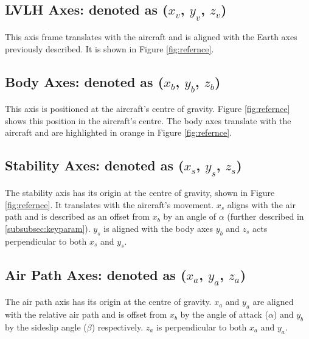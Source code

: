 \subsection{LVLH Axes: denoted as \texorpdfstring{($x_v$, $y_v$, $z_v$)}{L}}
 This axis frame translates with the aircraft and is aligned with the Earth axes previously described. It is shown in Figure \ref{fig:refernce}.

\subsection{Body Axes: denoted as \texorpdfstring{($x_b$, $y_b$, $z_b$)}{L}} 
This axis is positioned at the aircraft's centre of gravity. Figure \ref{fig:refernce} shows this position in the aircraft's centre. The body axes translate with the aircraft and are highlighted in orange in Figure \ref{fig:refernce}.

\subsection{Stability Axes: denoted as \texorpdfstring{($x_s$, $y_s$, $z_s$)}{L}} 
The stability axis has its origin at the centre of gravity, shown in Figure \ref{fig:refernce}. It translates with the aircraft's movement. $x_s$ aligns with the air path and is described as an offset from $x_b$ by an angle of $\alpha$ (further described in \ref{subsubsec:keyparam}). $y_s$ is aligned with the body axes $y_b$ and $z_s$ acts perpendicular to both $x_s$ and $y_s$.


\subsection{Air Path Axes: denoted as \texorpdfstring{($x_a$, $y_a$, $z_a$)}{L}}
The air path axis has its origin at the centre of gravity. $x_a$ and  $y_a$ are aligned with the relative air path and is offset from $x_b$ by the angle of attack ($\alpha$) and $y_b$ by the sideslip angle ($\beta$) respectively. $z_a$ is perpendicular to both $x_a$ and $y_a$. 


